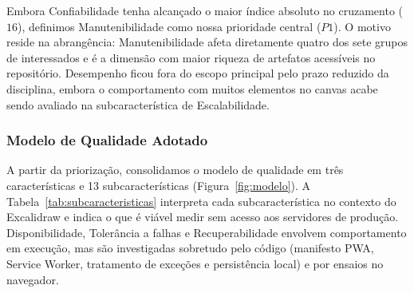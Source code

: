 \documentclass[12pt]{article}
\begin{document}
Embora Confiabilidade tenha alcançado o maior índice absoluto no cruzamento ($16$), definimos Manutenibilidade como nossa prioridade central ($P1$). O motivo reside na abrangência: Manutenibilidade afeta diretamente quatro dos sete grupos de interessados e é a dimensão com maior riqueza de artefatos acessíveis no repositório. Desempenho ficou fora do escopo principal pelo prazo reduzido da disciplina, embora o comportamento com muitos elementos no canvas acabe sendo avaliado na subcaracterística de Escalabilidade.

\subsubsection{Modelo de Qualidade Adotado}

A partir da priorização, consolidamos o modelo de qualidade em três características e 13 subcaracterísticas (Figura~\ref{fig:modelo}). A Tabela~\ref{tab:subcaracteristicas} interpreta cada subcaracterística no contexto do Excalidraw e indica o que é viável medir sem acesso aos servidores de produção. Disponibilidade, Tolerância a falhas e Recuperabilidade envolvem comportamento em execução, mas são investigadas sobretudo pelo código (manifesto PWA, Service Worker, tratamento de exceções e persistência local) e por ensaios no navegador.
\end{document}
